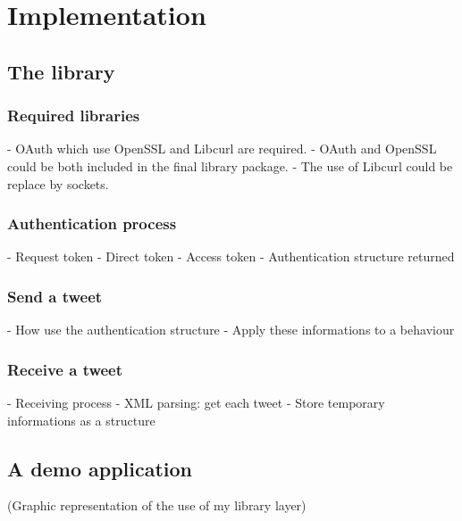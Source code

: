 \chapter{Implementation}

\section{The library}

\subsection{Required libraries}

- OAuth which use OpenSSL and Libcurl are required.
- OAuth and OpenSSL could be both included in the final library package.
- The use of Libcurl could be replace by sockets.


\subsection{Authentication process}

- Request token
- Direct token
- Access token
- Authentication structure returned


\subsection{Send a tweet}

- How use the authentication structure
- Apply these informations to a behaviour


\subsection{Receive a tweet}

- Receiving process
- XML parsing: get each tweet
- Store temporary informations as a structure



\section{A demo application}

(Graphic representation of the use of my library layer)


\clearpage